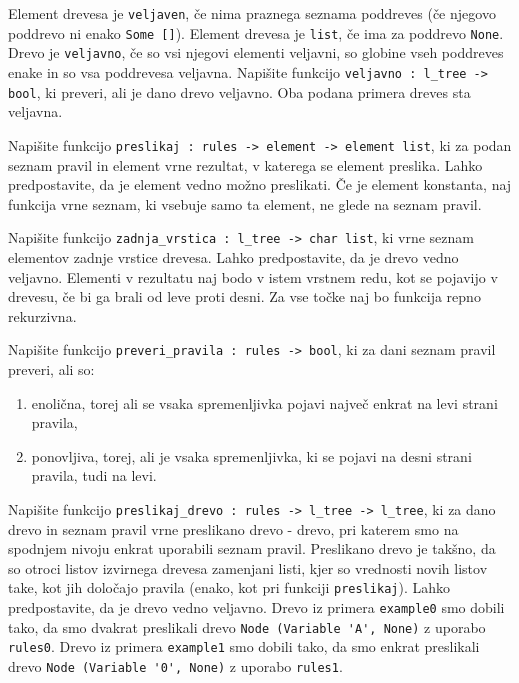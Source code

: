 \documentclass[arhiv]{../izpit}
\begin{document}
\podnaloga
Element drevesa je \verb|veljaven|, če nima praznega seznama poddreves (če njegovo poddrevo ni enako \verb|Some []|).
Element drevesa je \verb|list|, če ima za poddrevo \verb|None|.
Drevo je \verb|veljavno|, če so vsi njegovi elementi veljavni, so globine vseh poddreves enake in so vsa poddrevesa veljavna.
Napišite funkcijo \verb|veljavno : l_tree -> bool|, ki preveri, ali je dano drevo veljavno.
Oba podana primera dreves sta veljavna.


\podnaloga
Napišite funkcijo \verb|preslikaj : rules -> element -> element list|, ki za podan seznam pravil in element vrne rezultat, v katerega se element preslika.
Lahko predpostavite, da je element vedno možno preslikati.
Če je element konstanta, naj funkcija vrne seznam, ki vsebuje samo ta element, ne glede na seznam pravil.

\podnaloga
Napišite funkcijo \verb|zadnja_vrstica : l_tree -> char list|, ki vrne seznam elementov zadnje vrstice drevesa.
Lahko predpostavite, da je drevo vedno veljavno.
Elementi v rezultatu naj bodo v istem vrstnem redu, kot se pojavijo v drevesu, če bi ga brali od leve proti desni.
Za vse točke naj bo funkcija repno rekurzivna.

\podnaloga
Napišite funkcijo \verb|preveri_pravila : rules -> bool|, ki za dani seznam pravil preveri, ali so:
\begin{enumerate}
  \item enolična, torej ali se vsaka spremenljivka pojavi največ enkrat na levi strani pravila,
  \item ponovljiva, torej, ali je vsaka spremenljivka, ki se pojavi na desni strani pravila, tudi na levi.
\end{enumerate}

\podnaloga
Napišite funkcijo \verb|preslikaj_drevo : rules -> l_tree -> l_tree|, ki za dano drevo in seznam pravil vrne preslikano drevo - drevo, pri katerem smo na spodnjem nivoju enkrat uporabili seznam pravil.
Preslikano drevo je takšno, da so otroci listov izvirnega drevesa zamenjani listi, kjer so vrednosti novih listov take, kot jih določajo pravila (enako, kot pri funkciji \verb|preslikaj|).
Lahko predpostavite, da je drevo vedno veljavno.
Drevo iz primera \verb|example0| smo dobili tako, da smo dvakrat preslikali drevo \verb|Node (Variable 'A', None)| z uporabo \verb|rules0|.
Drevo iz primera \verb|example1| smo dobili tako, da smo enkrat preslikali drevo \verb|Node (Variable '0', None)| z uporabo \verb|rules1|.

\end{document}
